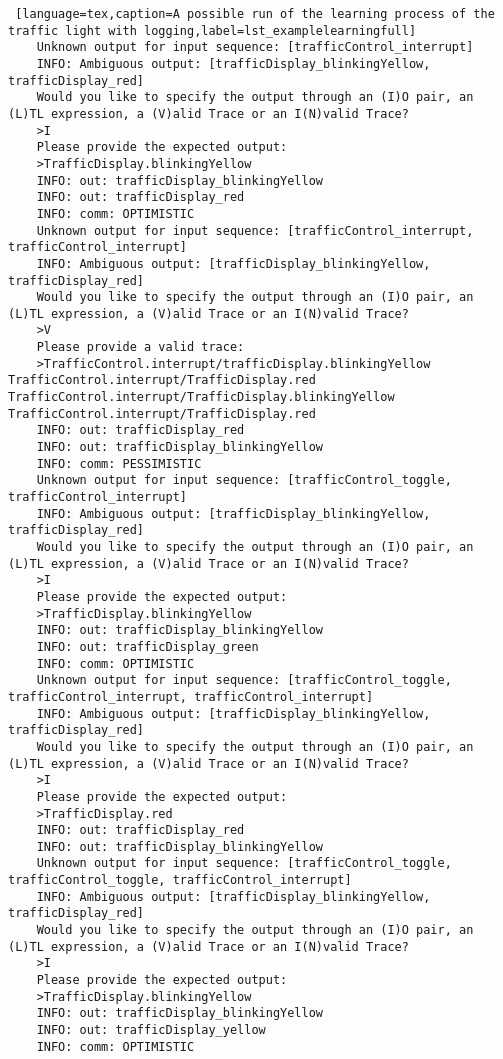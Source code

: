 \bigskip
\begin{lstlisting} [language=tex,caption=A possible run of the learning process of the traffic light with logging,label=lst_examplelearningfull]
	Unknown output for input sequence: [trafficControl_interrupt]
	INFO: Ambiguous output: [trafficDisplay_blinkingYellow, trafficDisplay_red]
	Would you like to specify the output through an (I)O pair, an (L)TL expression, a (V)alid Trace or an I(N)valid Trace?
	>I
	Please provide the expected output:
	>TrafficDisplay.blinkingYellow
	INFO: out: trafficDisplay_blinkingYellow
	INFO: out: trafficDisplay_red
	INFO: comm: OPTIMISTIC
	Unknown output for input sequence: [trafficControl_interrupt, trafficControl_interrupt]
	INFO: Ambiguous output: [trafficDisplay_blinkingYellow, trafficDisplay_red]
	Would you like to specify the output through an (I)O pair, an (L)TL expression, a (V)alid Trace or an I(N)valid Trace?
	>V
	Please provide a valid trace:
	>TrafficControl.interrupt/trafficDisplay.blinkingYellow TrafficControl.interrupt/TrafficDisplay.red TrafficControl.interrupt/TrafficDisplay.blinkingYellow TrafficControl.interrupt/TrafficDisplay.red
	INFO: out: trafficDisplay_red
	INFO: out: trafficDisplay_blinkingYellow
	INFO: comm: PESSIMISTIC
	Unknown output for input sequence: [trafficControl_toggle, trafficControl_interrupt]
	INFO: Ambiguous output: [trafficDisplay_blinkingYellow, trafficDisplay_red]
	Would you like to specify the output through an (I)O pair, an (L)TL expression, a (V)alid Trace or an I(N)valid Trace?
	>I
	Please provide the expected output:
	>TrafficDisplay.blinkingYellow
	INFO: out: trafficDisplay_blinkingYellow
	INFO: out: trafficDisplay_green
	INFO: comm: OPTIMISTIC
	Unknown output for input sequence: [trafficControl_toggle, trafficControl_interrupt, trafficControl_interrupt]
	INFO: Ambiguous output: [trafficDisplay_blinkingYellow, trafficDisplay_red]
	Would you like to specify the output through an (I)O pair, an (L)TL expression, a (V)alid Trace or an I(N)valid Trace?
	>I
	Please provide the expected output:
	>TrafficDisplay.red
	INFO: out: trafficDisplay_red
	INFO: out: trafficDisplay_blinkingYellow
	Unknown output for input sequence: [trafficControl_toggle, trafficControl_toggle, trafficControl_interrupt]
	INFO: Ambiguous output: [trafficDisplay_blinkingYellow, trafficDisplay_red]
	Would you like to specify the output through an (I)O pair, an (L)TL expression, a (V)alid Trace or an I(N)valid Trace?
	>I
	Please provide the expected output:
	>TrafficDisplay.blinkingYellow
	INFO: out: trafficDisplay_blinkingYellow
	INFO: out: trafficDisplay_yellow
	INFO: comm: OPTIMISTIC

\end{lstlisting}
